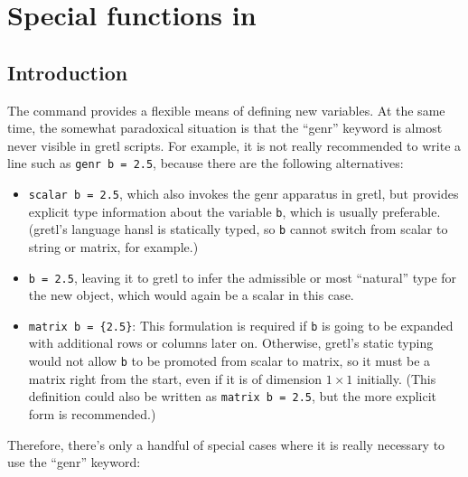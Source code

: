 \chapter{Special functions in }
\label{chap:genr}

\section{Introduction}
\label{genr-intro}

The  command provides a flexible means of defining new
variables. At the same time, the somewhat paradoxical situation is
that the ``genr'' keyword is almost never visible in gretl scripts. 
For example, it is not really recommended to write a line such as 
\texttt{genr b = 2.5}, because there are the following alternatives:

\begin{itemize}
\item \texttt{scalar b = 2.5}, which also invokes the genr apparatus
  in gretl, but provides explicit type information about the variable
  \texttt{b}, which is usually preferable. (gretl's language hansl is
  statically typed, so \texttt{b} cannot switch from scalar to string
  or matrix, for example.)
  
\item \texttt{b = 2.5}, leaving it to gretl to infer the admissible or
  most ``natural'' type for the new object, which would again be a
  scalar in this case.

\item \texttt{matrix b = \{2.5\}}: This formulation is required if
  \texttt{b} is going to be expanded with additional rows or columns
  later on. Otherwise, gretl's static typing would not allow
  \texttt{b} to be promoted from scalar to matrix, so it must be a
  matrix right from the start, even if it is of dimension $1 \times 1$
  initially.  (This definition could also be written as \texttt{matrix
    b = 2.5}, but the more explicit form is recommended.)
\end{itemize}

Therefore, there's only a handful of special cases where it is really
necessary to use the ``genr'' keyword:

